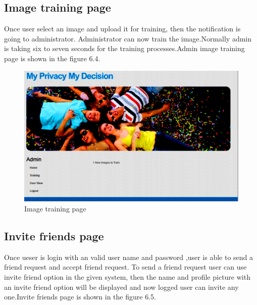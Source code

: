  \subsection[Image Training Page]{Image training page}
\noindent
Once user select an image and upload it for training, then the notification is going to administrator. Administrator can now train the image.Normally admin is taking six to seven seconds for the training processes.Admin image training  page is shown in the figure 6.4.
\vspace{1cm} 
\vspace{1cm}
\vspace{1cm}
\begin{figure}[H]
\begin{minipage}[c]{1\linewidth}
\begin{center}
 \includegraphics[width=\textwidth]{admintrain.png}
            \caption[Image Training Page]{Image training page}
             \label{Image training page}
\end{center}
\end{minipage}	
\end{figure}

\clearpage
 \subsection[Invite Friends Page]{Invite friends page}
\noindent
 Once ueser is login with an valid user name and password ,user is able to send a friend request and accept friend request.
To send a friend request user can use invite friend option in the given system, then the name and profile picture with an invite friend option will be displayed and now logged user can invite any one.Invite friends  page is shown in the figure 6.5.
\vspace{1cm} 
\vspace{1cm}
\vspace{1cm}
 
